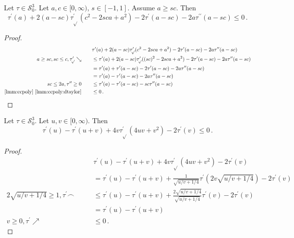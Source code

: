\documentclass{article}
\newcommand*{\mc}[1]{\mathcal{#1}}
\newcommand{\Rp}{[0, \infty)} %
\newcommand{\pr}{^\prime}
\newcommand{\prr}{^{\prime\prime}}
\newcommand{\equationFullstop}{\, .}
\newcommand{\eqfs}{\equationFullstop}
\newcommand{\tran}{\tau}
\newcommand{\trans}{\tran_{\!\sqrt{}}}
\newcommand{\dtrans}{\trans\pr}
\newcommand{\dtran}{\tran\pr}
\newcommand{\ddtran}{\tran\prr}
\newcommand{\setccod}[1]{\mc S_0^{#1}}
\newcommand{\incr}{\nearrow}
\newcommand{\decr}{\searrow}
\newcommand{\posi}{\geq0}
\newcommand{\conc}{\smallfrown}
\begin{document}
\begin{appendix}
%
\begin{lemma}\label{mech:7}
	Let $\tran\in\setccod3$.
	Let $a,c\in\Rp$, $s\in[-1,1]$.
	Assume $a \geq sc$.
	Then
	\begin{equation*}
		\dtran(a) + 2(a-sc)\dtrans(c^2-2sca+a^2) - 2 \dtran(a - sc) - 2 a \ddtran(a - sc) 
		\leq
		0
		\eqfs
	\end{equation*}
\end{lemma}
%
\begin{proof}
	\begin{align*}
		&
		\dtran(a) + 2(a-sc)\dtrans(c^2-2sca+a^2) - 2 \dtran(a - sc) - 2 a \ddtran(a - sc) 
		\\
		a \geq sc, sc \leq c, \dtrans\decr
		\qquad&\leq
		\dtran(a) + 2(a-sc)\dtrans((sc)^2-2sca+a^2) - 2 \dtran(a - sc) - 2 a \ddtran(a - sc) 
		\\
		\qquad&=
		\dtran(a) + \dtran(a - sc) - 2 \dtran(a - sc) - 2 a \ddtran(a - sc) 
		\\
		\qquad&=
		\dtran(a) - \dtran(a - sc) - 2 a \ddtran(a - sc) 
		\\
		sc \leq 2 a, \ddtran\posi
		\qquad&\leq
		\dtran(a) - \dtran(a - sc) - sc \ddtran(a - sc) 
		\\
		\text{\cref{lmm:ccpoly} \ref{lmm:ccpoly:dtaylor}}
		\qquad&\leq
		0
		\eqfs
	\end{align*}
\end{proof}
%
%
%
\begin{lemma}\label{mech:8}
	Let $\tran\in\setccod3$.
	Let $u,v\in\Rp$.
	Then
	\begin{equation*}
		\dtran(u) - \dtran(u+v) + 4v\dtrans(4uv + v^2) - 2\dtran(v)
		\leq
		0
		\eqfs
	\end{equation*}
\end{lemma}
%
\begin{proof}
	\begin{align*}
		&\dtran(u) - \dtran(u+v) + 4v\dtrans(4uv + v^2) - 2\dtran(v) 
		\\
		\qquad&=
		\dtran(u) - \dtran(u+v) + \frac{1}{\sqrt{u/v + 1/4}}\dtran(2v\sqrt{u/v + 1/4}) - 2\dtran(v) 
		\\
		2\sqrt{u/v + 1/4}\geq 1, \dtran\conc
		\qquad&\leq
		\dtran(u) - \dtran(u+v) + \frac{2\sqrt{u/v + 1/4}}{\sqrt{u/v + 1/4}}\dtran(v) - 2\dtran(v) 
		\\
		\qquad&=
		\dtran(u)-\dtran(u+v)
		\\
		v\geq0, \dtran\incr
		\qquad&\leq
		0 
		\eqfs
	\end{align*}
\end{proof}
%
%
\begin{lemma}\label{mech:9}

\end{lemma}
\end{appendix}
\end{document}
